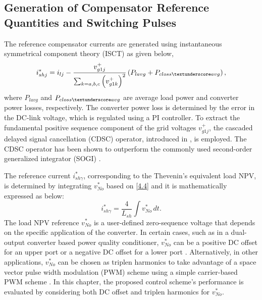 \vspace*{-0.5cm}
\subsection{Generation of Compensator Reference Quantities and Switching Pulses}
The reference compensator currents are generated using instantaneous symmetrical component theory (ISCT) \cite{4519806} as given below, 
\begin{equation} \label{4.20}
	i^{*}_{shj} = i_{lj} - \frac{v^{+}_{g1j}}{\sum_{k=a,b,c}^{}\left(v^{+}_{g1k}\right)^{2}} \left(P_{lavg} + P_{closs\textunderscore avg}\right), 
\end{equation}
where $P_{lavg}$ and $P_{closs\textunderscore avg}$ are average load power and converter power losses, respectively. The converter power loss is determined by the error in the DC-link voltage, which is regulated using a PI controller. To extract the fundamental positive sequence component of the grid voltages $v^{+}_{g1j}$, the cascaded delayed signal cancellation (CDSC) operator, introduced in \cite{5443553}, is employed. The CDSC operator has been shown to outperform the commonly used second-order generalized integrator (SOGI) \cite{9070288}. 

The reference current $i^{*}_{sh\gamma}$, corresponding to the Thevenin's equivalent load NPV, is determined by integrating $v^{*}_{No}$ based on \eqref{4.4} and it is mathematically expressed as below:
\begin{equation} \label{4.41}
	i^{*}_{sh\gamma} = \frac{4}{L_{sh}} \int v^{*}_{No} \, dt.
\end{equation}
The load NPV reference $v^{*}_{No}$ is a user-defined zero-sequence voltage that depends on the specific application of the converter. In certain cases, such as in a dual-output converter based power quality conditioner, $v^{*}_{No}$ can be a positive DC offset for an upper port or a negative DC offset for a lower port \cite{7018088}. Alternatively, in other applications, $v^{*}_{No}$ can be chosen as triplen harmonics to take advantage of a space vector pulse width modulation (PWM) scheme using a simple carrier-based PWM scheme \cite{1262054}. In this chapter, the proposed control scheme's performance is evaluated by considering both DC offset and triplen harmonics for $v^{*}_{No}$.


